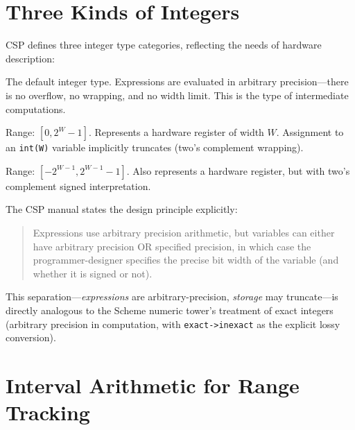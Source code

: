 \documentclass[12pt]{report}
\begin{document}
\section{Three Kinds of Integers}

CSP defines three integer type categories, reflecting the needs
of hardware description:

\begin{description}[style=nextline]
\item[{\tt int} (arbitrary precision).]
  The default integer type.  Expressions are evaluated in arbitrary
  precision---there is no overflow, no wrapping, and no width limit.
  This is the type of intermediate computations.

\item[{\tt int(W)} (unsigned, $W$~bits).]
  Range: $[0, 2^W - 1]$.  Represents a hardware register of width $W$.
  Assignment to an {\tt int(W)} variable implicitly truncates
  (two's complement wrapping).

\item[{\tt sint(W)} (signed, $W$~bits).]
  Range: $[-2^{W-1}, 2^{W-1}-1]$.  Also represents a hardware register,
  but with two's complement signed interpretation.
\end{description}

\noindent The CSP manual states the design principle explicitly:

\begin{quote}
  Expressions use arbitrary precision arithmetic, but variables can
  either have arbitrary precision OR specified precision, in which
  case the programmer-designer specifies the precise bit width of
  the variable (and whether it is signed or not).
\end{quote}

This separation---\emph{expressions} are arbitrary-precision,
\emph{storage} may truncate---is directly analogous to the Scheme
numeric tower's treatment of exact integers (arbitrary precision
in computation, with {\tt exact->inexact} as the explicit lossy
conversion).

\section{Interval Arithmetic for Range Tracking}
\end{document}
